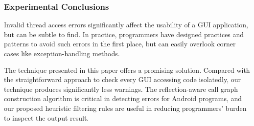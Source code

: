 \subsubsection{Experimental Conclusions}

Invalid thread access errors significantly affect the usability of
a GUI application, but can be subtle to find. In practice, programmers
have designed practices and patterns to avoid such errors in the first
place, but can easily overlook corner cases like exception-handling
methods.

The technique presented in this paper offers a promising solution.
Compared with the straightforward approach to check every
GUI accessing code isolatedly, our technique produces significantly
less warnings. The reflection-aware call graph construction algorithm
is critical in detecting errors for Android programs, and our
proposed heuristic filtering rules are useful in reducing programmers'
burden to inspect the output result.


